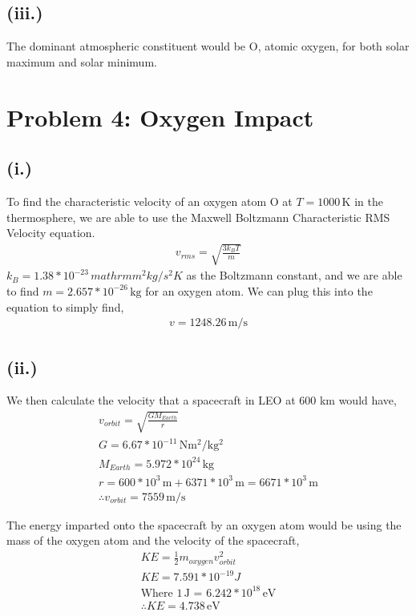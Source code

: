 \documentclass[11pt]{article}
\begin{document}
\subsection*{(iii.)}
\hspace*{2em}The dominant atmospheric constituent would be O, atomic oxygen, for both solar
maximum and solar minimum.

\newpage
\section*{Problem 4: Oxygen Impact}
\subsection*{(i.)}
\hspace*{2em}To find the characteristic velocity of an oxygen atom O at $T = 1000 \, \mathrm{K}$ in the thermosphere,
we are able to use the Maxwell Boltzmann Characteristic RMS Velocity equation.
\[
\begin{gathered}
v_{rms} = \sqrt{ \frac{3k_B T}{m} }
\end{gathered}
\]
\hspace*{2em}$k_B = 1.38*10^{-23} \, mathrm{m^2 kg / s^2 K}$ as the Boltzmann constant, and 
we are able to find $m = 2.657*10^{-26} \, \mathrm{kg}$ for an oxygen atom. We can plug this
into the equation to simply find,
\[
\begin{gathered}
\boxed{v = 1248.26 \, \mathrm{m/s}}    
\end{gathered}
\]

\subsection*{(ii.)}
\hspace*{2em}We then calculate the velocity that a 
spacecraft in LEO at 600 km would have,
\[
\begin{gathered}
v_{orbit} = \sqrt{\frac{GM_{Earth}}{r}} \\
G = 6.67*10^{-11} \, \mathrm{Nm^2/kg^2} \\
M_{Earth} = 5.972*10^{24} \, \mathrm{kg} \\
r = 600*10^3 \, \mathrm{m} + 6371*10^3 \, \mathrm{m} = 6671*10^3 \, \mathrm{m} \\
\therefore v_{orbit} = 7559 \, \mathrm{m/s}
\end{gathered}
\]

The energy imparted onto the spacecraft by an oxygen atom would be using the mass
of the oxygen atom and the velocity of the spacecraft,
\[
\begin{gathered}
KE = \frac{1}{2} m_{oxygen} v_{orbit}^2 \\
KE = 7.591*10^{-19} J \\
\text{Where $1\, \mathrm{J}$ = $6.242*10^{18} \, \mathrm{eV}$} \\
\boxed{\therefore KE = 4.738 \, \mathrm{eV}}
\end{gathered}
\]
\end{document}
